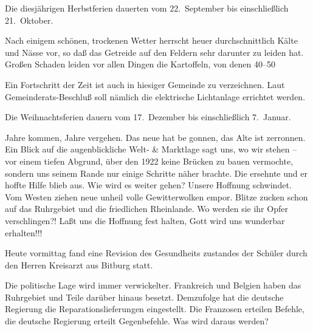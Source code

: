 

Die diesjährigen Herbstferien dauerten vom 22.\ September\ob
bis einschließlich 21.\ Oktober.

Nach einigem schönen, trockenen Wetter herrscht\ob
heuer durchschnittlich Kälte und Nässe vor, so daß das\ob
Getreide auf den Feldern sehr darunter zu leiden hat.\ob
Großen Schaden leiden vor allen Dingen die Kartoffeln,\ob
von denen 40--50 %

Ein Fortschritt der Zeit ist auch in hiesiger Gemeinde\ob
zu verzeichnen. Laut Gemeinderats-Beschluß soll nämlich\ob
die elektrische Lichtanlage errichtet werden.

%
Die Weihnachtsferien dauern vom 17.\ Dezember\ob
bis einschließlich 7.\ Januar.

\pend
{}
\pstart

Jahre kommen, Jahre vergehen. Das neue hat be\ohb
gonnen, das Alte ist zerronnen. Ein Blick auf die\ob
augenblickliche Welt- \& Marktlage sagt uns, wo wir\ob
stehen – vor einem tiefen Abgrund, über den 1922 keine\ob
Brücken zu bauen vermochte, sondern uns seinem Rande\ob
nur einige Schritte näher brachte. Die ersehnte und er\ohb
hoffte Hilfe blieb aus. Wie wird es weiter gehen? Unsere\ob
Hoffnung schwindet. Vom Westen ziehen neue unheil\ohb
volle Gewitterwolken empor. Blitze zucken schon auf das\ob
Ruhrgebiet und die friedlichen Rheinlande. Wo werden\ob
sie ihr Opfer verschlingen?! Laßt uns die Hoffnung fest\ohb
halten, Gott wird uns wunderbar erhalten!!!

%
Heute vormittag fand eine Revision des Gesundheits\ohb
zustandes der Schüler durch den Herren Kreisarzt aus\ob
Bitburg statt.

Die politische Lage wird immer verwickelter.\ob
Frankreich und Belgien haben das Ruhrgebiet und Teile\ob
darüber hinaus besetzt. Demzufolge hat die\ob
deutsche Regierung die Reparationslieferungen eingestellt.\ob
Die Franzosen erteilen Befehle, die deutsche Regierung\ob
erteilt Gegenbefehle. Was wird daraus werden?

\pend
{}
\pstart

\pend
